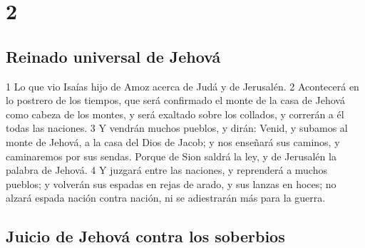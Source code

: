 \chapter{2}

\section*{Reinado universal de Jehová}

1 Lo que vio Isaías hijo de Amoz acerca de Judá y de Jerusalén.
2 Acontecerá en lo postrero de los tiempos, que será confirmado el monte de la casa de Jehová como cabeza de los montes, y será exaltado sobre los collados, y correrán a él todas las naciones.
3 Y vendrán muchos pueblos, y dirán: Venid, y subamos al monte de Jehová, a la casa del Dios de Jacob; y nos enseñará sus caminos, y caminaremos por sus sendas. Porque de Sion saldrá la ley, y de Jerusalén la palabra de Jehová.
4 Y juzgará entre las naciones, y reprenderá a muchos pueblos; y volverán sus espadas en rejas de arado, y sus lanzas en hoces; no alzará espada nación contra nación, ni se adiestrarán más para la guerra.

\section*{Juicio de Jehová contra los soberbios}

